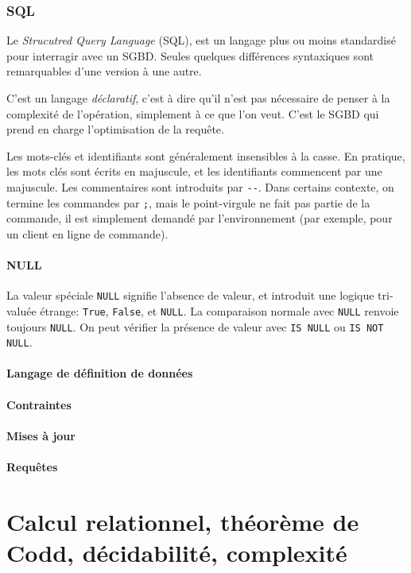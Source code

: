 \documentclass[french, toc]{../cs-classes/cs-classes}
\begin{document}
\subsubsection{SQL}
Le \emph{Strucutred Query Language} (SQL), est un langage plus ou moins standardisé pour interragir avec un SGBD. Seules quelques différences syntaxiques sont remarquables d'une version à une autre. 

C'est un langage \emph{déclaratif}, c'est à dire qu'il n'est pas nécessaire de penser à la complexité de l'opération, simplement à ce que l'on veut. C'est le SGBD qui prend en charge l'optimisation de la requête.

Les mots-clés et identifiants sont généralement insensibles à la casse. En pratique, les mots clés sont écrits en majuscule, et les identifiants commencent par une majuscule. Les commentaires sont introduits par \texttt{-}\texttt{-}. Dans certains contexte, on termine les commandes par \texttt{;}, mais le point-virgule ne fait pas partie de la commande, il est simplement demandé par l'environnement (par exemple, pour un client en ligne de commande).

\paragraph*{NULL} La valeur spéciale \texttt{NULL} signifie l'absence de valeur, et introduit une logique tri-valuée étrange: \texttt{True}, \texttt{False}, et \texttt{NULL}. La comparaison normale avec \texttt{NULL} renvoie toujours \texttt{NULL}. On peut vérifier la présence de valeur avec \texttt{IS NULL} ou \texttt{IS NOT NULL}.

\paragraph*{Langage de définition de données}

\paragraph*{Contraintes}

\paragraph*{Mises à jour}

\paragraph*{Requêtes}

\section{Calcul relationnel, théorème de Codd, décidabilité, complexité}
\end{document}
